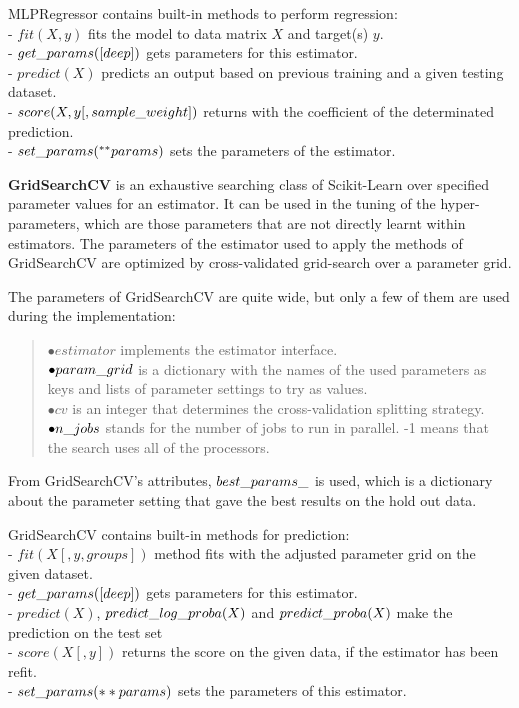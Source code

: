 MLPRegressor contains built-in methods to perform regression:\\
- $fit(X, y)$ fits the model to data matrix $X$ and target(s) $y$.\\
- $get\char`_params([deep])$ gets parameters for this estimator.\\
- $predict(X)$ predicts an output based on previous training and a given testing dataset.\\
- $score(X, y[, sample\char`_weight])$ returns with the coefficient of the determinated prediction.\\
- $set\char`_params(^{**} params)$ sets the parameters of the estimator.\bigskip


\textbf{GridSearchCV} \cite{jolly2018machine} is an exhaustive searching class of Scikit-Learn over specified parameter values for an estimator. It can be used in the tuning of the hyper-parameters, which are those parameters that are not directly learnt within estimators. The parameters of the estimator used to apply the methods of GridSearchCV are optimized by cross-validated grid-search over a parameter grid.\medskip

\noindent The parameters of GridSearchCV are quite wide, but only a few of them are used during the implementation:
\begin{verse}
	$\bullet estimator$ implements the estimator interface. \\
	$\bullet param\char`_grid$ is a dictionary with the names of the used parameters as keys and lists of parameter settings to try as values.\\
	$\bullet cv$ is an integer that determines the cross-validation splitting strategy.\\
	$\bullet n\char`_jobs$ stands for the number of jobs to run in parallel. -1 means that the search uses all of the processors. 
\end{verse}

From GridSearchCV's attributes, $best\char`_params\char`_$ is used, which is a dictionary about the parameter setting that gave the best results on the hold out data.\medskip

\noindent GridSearchCV contains built-in methods for prediction:\\
- $fit(X[, y, groups])$ method fits with the adjusted parameter grid on the given dataset.\\
- $get\char`_params([deep])$ gets parameters for this estimator.\\
- $predict(X)$, $predict\char`_log\char`_proba(X)$ and $predict\char`_proba(X)$ make the prediction on the test set\\
- $score(X[, y])$ returns the score on the given data, if the estimator has been refit.\\
- $set\char`_params(**params)$ sets the parameters of this estimator.\bigskip



